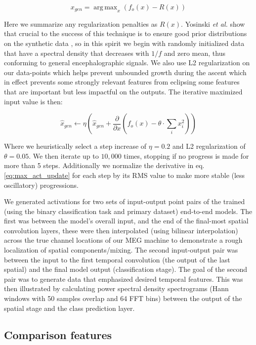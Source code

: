 \documentclass[fleqn,10pt]{wlscirep}
\DeclareMathOperator*{\argmaxA}{arg\,max}
\begin{document}
\begin{equation} \label{eq:max_act}
  x_{gen} = \argmaxA_x(f_o(x) - R(x))
\end{equation}

Here we summarize any regularization penalties as $R(x)$. Yosinski {\em et al.} show that crucial to the success of this technique is to ensure good prior distributions on the synthetic data \cite{Yosinski2015}, so in this spirit we begin with randomly initialized data that have a spectral density that decreases with $1/f$ and zero mean, thus conforming to general encephalographic signals. We also use L2 regularization on our data-points which helps prevent unbounded growth during the ascent which in effect prevents some strongly relevant features from eclipsing some features that are important but less impactful on the outputs. The iterative maximized input value is then:

\begin{equation} \label{eq:max_act_update}
  \hat{x}_{gen} \leftarrow \eta \left(\hat{x}_{gen} + \frac{\partial }{\partial x}(f_o(x) - \theta \cdot {}\sum_ix_i^2) \right)
\end{equation}

Where we heuristically select a step increase of $\eta = 0.2$ and L2 regularization of $\theta = 0.05$. We then iterate up to $10,000$ times, stopping if no progress is made for more than 5 steps. Additionally we normalize the derivative in eq. \ref{eq:max_act_update} for each step by its RMS value to make more stable (less oscillatory) progressions.

We generated activations for two sets of input-output point pairs of the trained (using the binary classification task and primary dataset) end-to-end models. The first was between the model's overall input, and the end of the final-most spatial convolution layers, these were then interpolated (using bilinear interpolation) across the true channel locations of our MEG machine to demonstrate a rough localization of spatial components/mixing. The second input-output pair was between the input to the first temporal convolution (the output of the last spatial) and the final model output (classification stage). The goal of the second pair was to generate data that emphasized desired temporal features. This was then illustrated by calculating power spectral density spectrograms (Hann windows with 50 samples overlap and 64 FFT bins) between the output of the spatial stage and the class prediction layer.

\subsection*{Comparison features}
\end{document}
